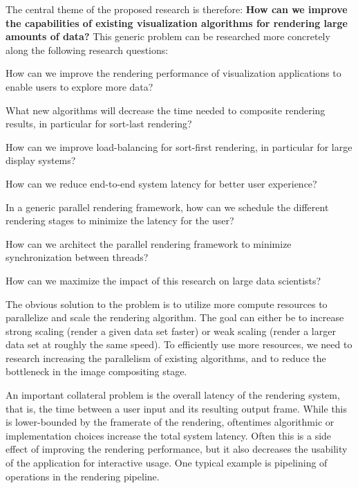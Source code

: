 The central theme of the proposed research is therefore: {\bf How can we improve
the capabilities of existing visualization algorithms for rendering large
amounts of data?} This generic problem can be researched more concretely along
the following research questions:
\begin{compactenum}
\item How can we improve the rendering performance of visualization applications to enable users to explore more data?
    \begin{compactenum}
    \item What new algorithms will decrease the time needed to composite rendering results, in particular for sort-last rendering?
    \item How can we improve load-balancing for sort-first rendering, in particular for large display systems?
    \end{compactenum}
\item How can we reduce end-to-end system latency for better user experience?
    \begin{compactenum}
    \item In a generic parallel rendering framework, how can we schedule the different rendering stages to minimize the latency for the user?
    \item How can we architect the parallel rendering framework to minimize synchronization between threads?
    \end{compactenum}
\item How can we maximize the impact of this research on large data scientists?
\end{compactenum}

The obvious solution to the problem is to utilize more compute resources to
parallelize and scale the rendering algorithm. The goal can either be to
increase strong scaling (render a given data set faster) or weak scaling (render
a larger data set at roughly the same speed). To efficiently use more resources,
we need to research increasing the parallelism of existing algorithms, and to
reduce the bottleneck in the image compositing stage.

An important collateral problem is the overall latency of the rendering system,
that is, the time between a user input and its resulting output frame. While
this is lower-bounded by the framerate of the rendering, oftentimes algorithmic
or implementation choices increase the total system latency. Often this is a
side effect of improving the rendering performance, but it also decreases the
usability of the application for interactive usage. One typical example is
pipelining of operations in the rendering pipeline.

